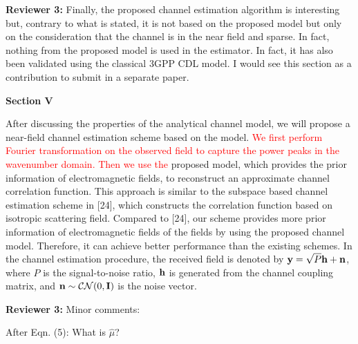 \documentclass[a4paper,12pt]{article}
\begin{document}
\textbf{Reviewer 3:}
Finally, the proposed channel estimation algorithm is interesting but, contrary to what is stated, it is not based on the proposed model but only on the consideration that the channel is in the near field and sparse. In fact, nothing from the proposed model is used in the estimator. In fact, it has also been validated using the classical 3GPP CDL model. I would see this section as a contribution to submit in a separate paper.

{}

\begin{framed}
	{\bf{Section V}}

	\quad After discussing the properties of the analytical channel model, we will propose a near-field channel estimation scheme based on the model. {\textcolor{red}{We first perform Fourier transformation on the observed field to capture the power peaks in the wavenumber domain. Then we use the }{\color{red} proposed model, which provides the prior information of electromagnetic fields, to reconstruct an approximate channel correlation function. This approach is similar to the subspace based channel estimation scheme in [24], which constructs the correlation function based on isotropic scattering field. Compared to [24], our scheme provides more prior information of electromagnetic fields of the fields by using the proposed channel model. Therefore, it can achieve better performance than the existing schemes. }}In the channel estimation procedure, the received field is denoted by ${\bf y}=\sqrt{P}{\bf h}+{\bf n}$, where $P$ is the signal-to-noise ratio, ${\bf h}$ is generated from the channel coupling matrix, and ${\bf n} \sim \mathcal{CN}(0,{\bf I})$ is the noise vector. 
\end{framed}


\textbf{Reviewer 3:}
Minor comments:

After Eqn. (5): What is $\hat{\mu}$?

{}
\end{document}

